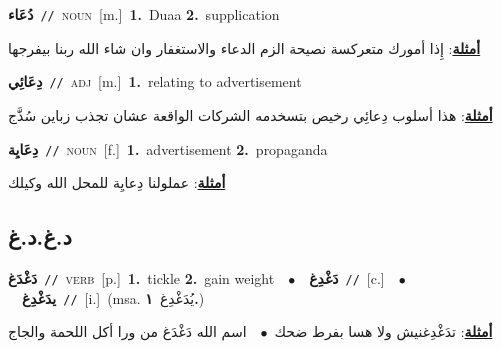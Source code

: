 \documentclass[10pt,a4paper,twoside]{article} %
\begin{document}
\begin{multicols}{2}
{\setlength\topsep{0pt}\textbf{\foreignlanguage{arabic}{دُعَاء}}\ {\color{gray}\texttt{//}\color{black}}\ \textsc{noun}\ [m.]\ \textbf{1.}~Duaa  \textbf{2.}~supplication\  \begin{flushright}\color{gray}\foreignlanguage{arabic}{\textbf{\underline{\foreignlanguage{arabic}{أمثلة}}}: إِذا أمورك متعركسة  نصيحة الزم الدعاء والاستغفار وان شاء الله ربنا بيفرجها}\end{flushright}\color{black}} \vspace{2mm}

{\setlength\topsep{0pt}\textbf{\foreignlanguage{arabic}{دِعَائِي}}\ {\color{gray}\texttt{//}\color{black}}\ \textsc{adj}\ [m.]\ \textbf{1.}~relating to advertisement\  \begin{flushright}\color{gray}\foreignlanguage{arabic}{\textbf{\underline{\foreignlanguage{arabic}{أمثلة}}}: هذا أسلوب دِعائِي رخيص بتسخدمه الشركات الواقعة عشان تجذب زباين سُذَّج}\end{flushright}\color{black}} \vspace{2mm}

{\setlength\topsep{0pt}\textbf{\foreignlanguage{arabic}{دِعَايِة}}\ {\color{gray}\texttt{//}\color{black}}\ \textsc{noun}\ [f.]\ \textbf{1.}~advertisement  \textbf{2.}~propaganda\  \begin{flushright}\color{gray}\foreignlanguage{arabic}{\textbf{\underline{\foreignlanguage{arabic}{أمثلة}}}: عملولنا دِعايِة للمحل الله وكيلك}\end{flushright}\color{black}} \vspace{2mm}

\vspace{-3mm}
\subsection*{\color{blue}\foreignlanguage{arabic}{د.غ.د.غ}\color{blue}{}} 

{\setlength\topsep{0pt}\textbf{\foreignlanguage{arabic}{دَغْدَغ}}\ {\color{gray}\texttt{//}\color{black}}\ \textsc{verb}\ [p.]\ \textbf{1.}~tickle  \textbf{2.}~gain weight\ \ $\bullet$\ \ \setlength\topsep{0pt}\textbf{\foreignlanguage{arabic}{دَغْدِغ}}\ {\color{gray}\texttt{//}\color{black}}\ [c.]\ \ $\bullet$\ \ \setlength\topsep{0pt}\textbf{\foreignlanguage{arabic}{يدَغْدِغ}}\ {\color{gray}\texttt{//}\color{black}}\ [i.]\ \color{gray}(msa. \foreignlanguage{arabic}{يُدَغْدِغ}~\foreignlanguage{arabic}{\textbf{١.}})\color{black}\  \begin{flushright}\color{gray}\foreignlanguage{arabic}{\textbf{\underline{\foreignlanguage{arabic}{أمثلة}}}: تدَغْدِغنيش ولا هسا بفرط ضحك\ $\bullet$\ \  اسم الله دَغْدَغ من ورا أكل اللحمة والجاج}\end{flushright}\color{black}} \vspace{2mm}


\end{multicols}
\end{document}
